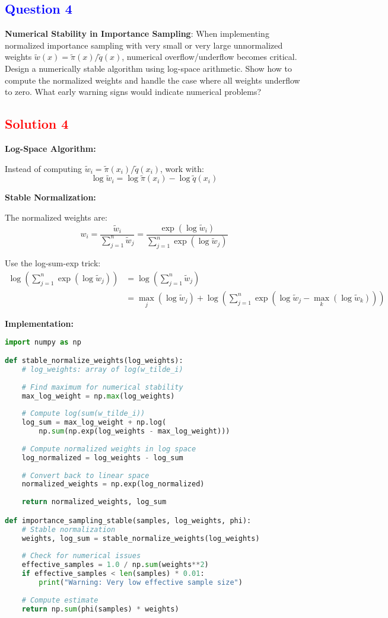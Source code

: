 \documentclass[11pt]{article}
\newcommand{\question}[1]{\subsection*{\textcolor{blue}{Question #1}}}
\newcommand{\solution}[1]{\subsection*{\textcolor{red}{Solution #1}}}
\begin{document}
\question{4}
\textbf{Numerical Stability in Importance Sampling}: When implementing normalized importance sampling with very small or very large unnormalized weights $\tilde{w}(x) = \tilde{\pi}(x)/\tilde{q}(x)$, numerical overflow/underflow becomes critical. Design a numerically stable algorithm using log-space arithmetic. Show how to compute the normalized weights and handle the case where all weights underflow to zero. What early warning signs would indicate numerical problems?

\solution{4}
\textbf{Log-Space Algorithm:}

Instead of computing $\tilde{w}_i = \tilde{\pi}(x_i)/\tilde{q}(x_i)$, work with:
$$\log \tilde{w}_i = \log \tilde{\pi}(x_i) - \log \tilde{q}(x_i)$$

\textbf{Stable Normalization:}

The normalized weights are:
$$w_i = \frac{\tilde{w}_i}{\sum_{j=1}^n \tilde{w}_j} = \frac{\exp(\log \tilde{w}_i)}{\sum_{j=1}^n \exp(\log \tilde{w}_j)}$$

Use the log-sum-exp trick:
\begin{align}
\log\left(\sum_{j=1}^n \exp(\log \tilde{w}_j)\right) &= \log\left(\sum_{j=1}^n \tilde{w}_j\right)\\
&= \max_j(\log \tilde{w}_j) + \log\left(\sum_{j=1}^n \exp(\log \tilde{w}_j - \max_k(\log \tilde{w}_k))\right)
\end{align}

\textbf{Implementation:}
\begin{lstlisting}[language=Python, basicstyle=\small]
import numpy as np

def stable_normalize_weights(log_weights):
    # log_weights: array of log(w_tilde_i)
    
    # Find maximum for numerical stability
    max_log_weight = np.max(log_weights)
    
    # Compute log(sum(w_tilde_i))
    log_sum = max_log_weight + np.log(
        np.sum(np.exp(log_weights - max_log_weight)))
    
    # Compute normalized weights in log space
    log_normalized = log_weights - log_sum
    
    # Convert back to linear space
    normalized_weights = np.exp(log_normalized)
    
    return normalized_weights, log_sum

def importance_sampling_stable(samples, log_weights, phi):
    # Stable normalization
    weights, log_sum = stable_normalize_weights(log_weights)
    
    # Check for numerical issues
    effective_samples = 1.0 / np.sum(weights**2)
    if effective_samples < len(samples) * 0.01:
        print("Warning: Very low effective sample size")
    
    # Compute estimate
    return np.sum(phi(samples) * weights)
\end{lstlisting}
\end{document}
